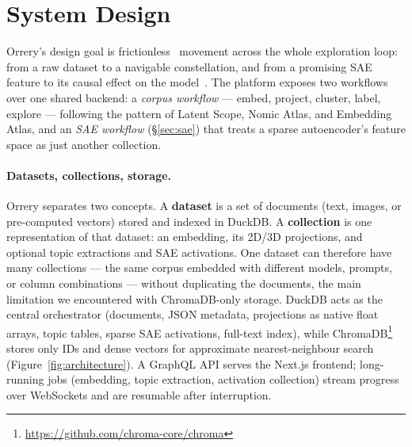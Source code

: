 
\section{System Design}
\label{sec:system}

Orrery's design goal is frictionless~\cite{ren2025embeddingatlaslowfrictioninteractive} movement across the whole exploration loop: from a raw dataset to a navigable constellation, and from a promising SAE feature to its causal effect on the model~\cite{templeton2024scaling}. The platform exposes two workflows over one shared backend: a \emph{corpus workflow} --- embed, project, cluster, label, explore --- following the pattern of Latent Scope, Nomic Atlas, and Embedding Atlas, and an \emph{SAE workflow} (\S\ref{sec:sae}) that treats a sparse autoencoder's feature space as just another collection.

\paragraph{Datasets, collections, storage.}
Orrery separates two concepts. A \textbf{dataset} is a set of documents (text, images, or pre-computed vectors) stored and indexed in DuckDB. A \textbf{collection} is one representation of that dataset: an embedding, its 2D/3D projections, and optional topic extractions and SAE activations. One dataset can therefore have many collections --- the same corpus embedded with different models, prompts, or column combinations --- without duplicating the documents, the main limitation we encountered with ChromaDB-only storage. DuckDB acts as the central orchestrator (documents, JSON metadata, projections as native float arrays, topic tables, sparse SAE activations, full-text index), while ChromaDB\footnote{\url{https://github.com/chroma-core/chroma}} stores only IDs and dense vectors for approximate nearest-neighbour search (Figure~\ref{fig:architecture}). A GraphQL API serves the Next.js frontend; long-running jobs (embedding, topic extraction, activation collection) stream progress over WebSockets and are resumable after interruption.

